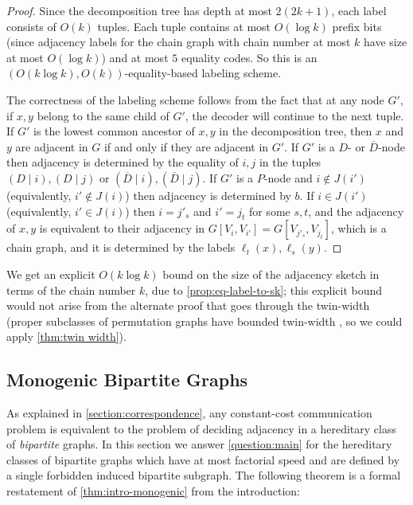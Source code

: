 \documentclass{article}
\newcommand\eqLabelSep{\mathbin|}
\begin{document}
\begin{proof}
Since the decomposition tree has depth at most $2(2k+1)$, each label consists of $O(k)$ tuples.
Each tuple contains at most $O(\log k)$ prefix bits (since adjacency labels for the chain graph with
chain number at most $k$ have size at most $O(\log k)$) and at most $5$ equality codes. So this is
an $( O(k\log k), O(k) )$-equality-based labeling scheme.

The correctness of the labeling scheme follows from the fact that at any node $G'$, if $x,y$
belong to the same child of $G'$, the decoder will continue to the next tuple. If $G'$ is the
lowest common ancestor of $x,y$ in the decomposition tree, then $x$ and $y$ are adjacent in $G$
if and only if they are adjacent in $G'$. If $G'$ is a $D$- or $\overline D$-node then adjacency
is determined by the equality of $i,j$ in the tuples $(D \eqLabelSep i), (D \eqLabelSep j)$ or $(\overline D \eqLabelSep
i), (\overline D \eqLabelSep j)$. If $G'$ is a $P$-node and $i \notin J(i')$ (equivalently, $i' \notin
J(i)$) then adjacency is determined by $b$. If $i \in J(i')$ (equivalently, $i' \in J(i)$) then $i =
j'_s$ and $i' = j_t$ for some $s,t$, and the adjacency of $x,y$ is equivalent to their adjacency in
$G[V_i, V_{i'}] = G[V_{j'_s}, V_{j_t}]$, which is a chain graph, and it is determined by the
labels $\ell_t(x), \ell_s(y)$.
\end{proof}

\begin{remark}
We get an explicit $O(k \log k)$ bound on the size of the adjacency sketch in terms of the chain
number $k$, due to \cref{prop:eq-label-to-sk};
this explicit bound would not arise from the alternate proof that goes through the twin-width
(proper subclasses of permutation graphs have bounded twin-width \cite{BKTW20}, so we could apply
\cref{thm:twin width}).
\end{remark}

\subsection{Monogenic Bipartite Graphs}
\label{section:bipartite graphs}

As explained in \cref{section:correspondence}, any constant-cost communication problem is equivalent
to the problem of deciding adjacency in a hereditary class of \emph{bipartite} graphs. In this
section we answer \cref{question:main} for the hereditary classes of bipartite graphs which have at
most factorial speed and are defined by a single forbidden induced bipartite subgraph.
The following theorem is a formal restatement of \cref{thm:intro-monogenic} from the introduction:
\end{document}
